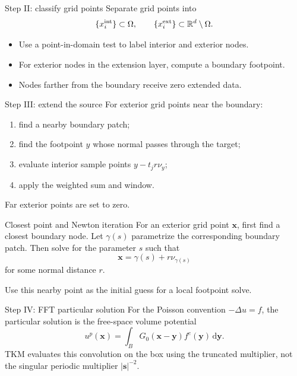 \documentclass[aspectratio=169,11pt]{beamer}
\newcommand{\R}{\mathbb{R}}
\newcommand{\dd}{\,\mathrm d}
\newcommand{\x}{\bm{x}}
\newcommand{\y}{\bm{y}}
\newcommand{\s}{\bm{s}}
\begin{document}
\begin{frame}{Step II: classify grid points}
\small
Separate grid points into
\[
  \{x_i^{\rm int}\}\subset\Omega,
  \qquad
  \{x_i^{\rm ext}\}\subset\R^d\setminus\Omega.
\]

\begin{itemize}
  \item Use a point-in-domain test to label interior and exterior nodes.
  \item For exterior nodes in the extension layer, compute a boundary footpoint.
  \item Nodes farther from the boundary receive zero extended data.
\end{itemize}
\end{frame}

\begin{frame}{Step III: extend the source}
\small
For exterior grid points near the boundary:
\begin{enumerate}
  \item find a nearby boundary patch;
  \item find the footpoint $y$ whose normal passes through the target;
  \item evaluate interior sample points $y-t_jr\nu_y$;
  \item apply the weighted sum and window.
\end{enumerate}

\vspace{2mm}
Far exterior points are set to zero.
\end{frame}

\begin{frame}{Closest point and Newton iteration}
\small
For an exterior grid point $\x$, first find a closest boundary node.
Let $\gamma(s)$ parametrize the corresponding boundary patch. Then solve for
the parameter $s$ such that
\[
  \x=\gamma(s)+r\nu_{\gamma(s)}
\]
for some normal distance $r$.

\vspace{2mm}
Use this nearby point as the initial guess for a local footpoint solve.
\end{frame}

\begin{frame}{Step IV: FFT particular solution}
\small
For the Poisson convention $-\Delta u=f$, the particular solution is the
free-space volume potential
\[
  u^p(\x)=\int_B G_0(\x-\y)f^e(\y)\dd\y.
\]
TKM evaluates this convolution on the box using the truncated multiplier,
not the singular periodic multiplier $|\s|^{-2}$.
\end{frame}
\end{document}
